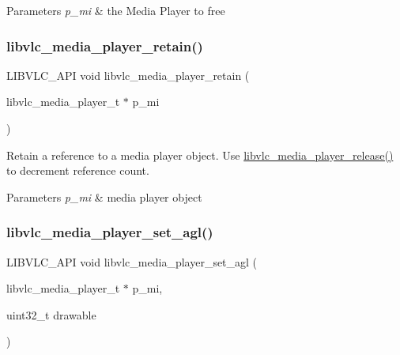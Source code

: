 \begin{DoxyParams}{Parameters}
{\em p\+\_\+mi} & the Media Player to free \\
\hline
\end{DoxyParams}
\mbox{\label{group__libvlc__media__player_gac05d1395d425db194eda5a29a03c346a}} 
\subsubsection{\texorpdfstring{libvlc\+\_\+media\+\_\+player\+\_\+retain()}{libvlc\_media\_player\_retain()}}
{\footnotesize\ttfamily L\+I\+B\+V\+L\+C\+\_\+\+A\+PI void libvlc\+\_\+media\+\_\+player\+\_\+retain (\begin{DoxyParamCaption}\item[{libvlc\+\_\+media\+\_\+player\+\_\+t $\ast$}]{p\+\_\+mi }\end{DoxyParamCaption})}

Retain a reference to a media player object. Use \hyperlink{group__libvlc__media__player_gac8d8236f3dfa549d3637100ae6d07e72}{libvlc\+\_\+media\+\_\+player\+\_\+release()} to decrement reference count.


\begin{DoxyParams}{Parameters}
{\em p\+\_\+mi} & media player object \\
\hline
\end{DoxyParams}
\mbox{\label{group__libvlc__media__player_gadc35c9afb5789c16fbe8e1f358ec141b}} 
\subsubsection{\texorpdfstring{libvlc\+\_\+media\+\_\+player\+\_\+set\+\_\+agl()}{libvlc\_media\_player\_set\_agl()}}
{\footnotesize\ttfamily L\+I\+B\+V\+L\+C\+\_\+\+A\+PI void libvlc\+\_\+media\+\_\+player\+\_\+set\+\_\+agl (\begin{DoxyParamCaption}\item[{libvlc\+\_\+media\+\_\+player\+\_\+t $\ast$}]{p\+\_\+mi,  }\item[{uint32\+\_\+t}]{drawable }\end{DoxyParamCaption})}


